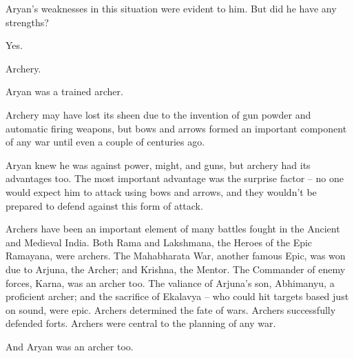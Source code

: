 Aryan's weaknesses in this situation were evident to him. But did he have any
strengths?

Yes.

Archery.

Aryan was a trained archer.

Archery may have lost its sheen due to the invention of gun powder and automatic
firing weapons, but bows and arrows formed an important component of any war
until even a couple of centuries ago.

Aryan knew he was against power, might, and guns, but archery had its advantages
too. The most important advantage was the surprise factor – no one would expect
him to attack using bows and arrows, and they wouldn't be prepared to defend
against this form of attack.

Archers have been an important element of many battles fought in the Ancient and
Medieval India. Both Rama and Lakshmana, the Heroes of the Epic Ramayana, were
archers. The Mahabharata War, another famous Epic, was won due to Arjuna, the
Archer; and Krishna, the Mentor. The Commander of enemy forces, Karna, was an
archer too. The valiance of Arjuna's son, Abhimanyu, a proficient archer; and
the sacrifice of Ekalavya – who could hit targets based just on sound, were
epic. Archers determined the fate of wars. Archers successfully defended forts.
Archers were central to the planning of any war.

And Aryan was an archer too.